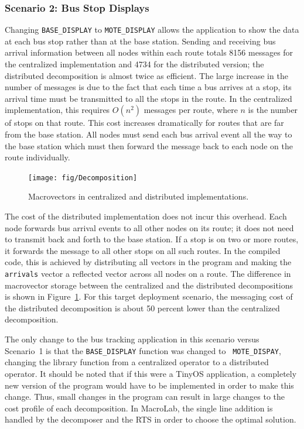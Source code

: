 \subsubsection{Scenario 2: Bus Stop Displays} 

Changing {\tt BASE\_DISPLAY} to {\tt MOTE\_DISPLAY} allows the application to
show the data at each bus stop rather than at the base station. Sending and
receiving bus arrival information between all nodes within each route totals
8156 messages for the centralized implementation and 4734 for the distributed
version; the distributed decomposition is almost twice as efficient.  The large
increase in the number of messages is due to the fact that each time a bus
arrives at a stop, its arrival time must be transmitted to all the stops in the
route. In the centralized implementation, this requires $O(n^2)$ messages per
route, where $n$ is the number of stops on that route. This cost increases
dramatically for routes that are far from the base station. All nodes must send
each bus arrival event all the way to the base station which must then forward
the message back to each node on the route individually.

\begin{figure}
  \centering
  \texttt{[image: fig/Decomposition]}
  \caption{Macrovectors in centralized and distributed implementations.}
  \label{fig:Decomposition}
\end{figure}

The cost of the distributed implementation does not incur this overhead. Each
node forwards bus arrival events to all other nodes on its route; it does not
need to transmit back and forth to the base station.  If a stop is on two or
more routes, it forwards the message to all other stops on all such routes.  In
the compiled code, this is achieved by distributing all vectors in the program
and making the {\tt arrivals} vector a reflected vector across all nodes on a
route.  The difference in macrovector storage between the centralized and the
distributed decompositions is shown in Figure~\ref{fig:Decomposition}.  For this
target deployment scenario, the messaging cost of the distributed decomposition
is about 50 percent lower than the centralized decomposition.

The only change to the bus tracking application in this scenario versus
Scenario~1 is that the {\tt BASE\_DISPLAY} function was changed to {\tt
MOTE\_DISPAY}, changing the library function from a centralized operator to a
distributed operator.  It should be noted that if this were a TinyOS
application, a completely new version of the program would have to be
implemented in order to make this change.  Thus, small changes in the program
can result in large changes to the cost profile of each decomposition.  In
MacroLab, the single line addition is handled by the decomposer and the RTS in
order to choose the optimal solution.

